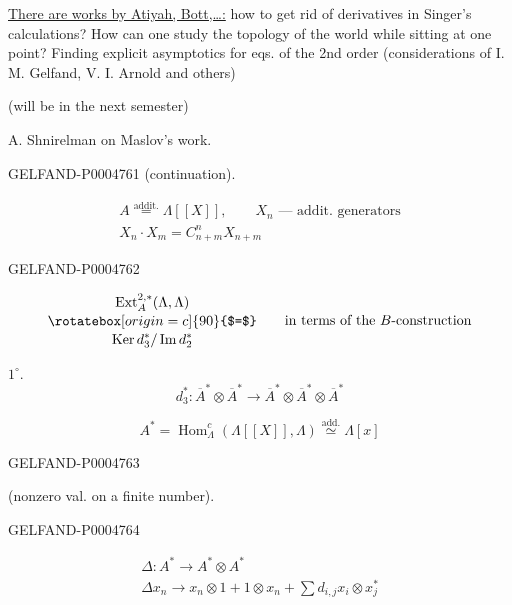 \uline{There are works by Atiyah, Bott,\ldots:} how to get rid of derivatives in Singer's calculations?
How can one study the topology of the world while sitting at one point? Finding explicit asymptotics for eqs. of the 2nd order (considerations of I. M. Gelfand, V. I. Arnold and others)

(will be in the next semester)

A. Shnirelman on Maslov's work.


\begin{GelfandAdjacentEvidence}{GELFAND-P000476}{1}
 (continuation).

\[
\begin{gathered}
A\overset{\text{addit.}}{=}\Lambda[[X]],\qquad
X_n\text{ — addit. generators}\\
X_n\cdot X_m=C_{n+m}^n X_{n+m}
\end{gathered}
\]
\end{GelfandAdjacentEvidence}
\begin{GelfandAdjacentEvidence}{GELFAND-P000476}{2}


\[
\begin{gathered}
\operatorname{Ext}_A^{2,*}(\Lambda,\Lambda)\\[-.4ex]
\rotatebox[origin=c]{90}{$=$}\\[-.4ex]
\operatorname{Ker}d_3^*/\operatorname{Im}d_2^*
\end{gathered}
\qquad\text{in terms of the }B\text{-construction}
\]

$1^\circ$.
\[
d_3^*\colon\overline A^*\otimes\overline A^*
\longrightarrow\overline A^*\otimes\overline A^*\otimes\overline A^*
\]

\[
A^*=\operatorname{Hom}_{\Lambda}^{c}(\Lambda[[X]],\Lambda)
\overset{\text{add.}}{\simeq}\Lambda[x]
\]
\end{GelfandAdjacentEvidence}
\begin{GelfandAdjacentEvidence}{GELFAND-P000476}{3}

 (nonzero val. on a finite number).
\end{GelfandAdjacentEvidence}
\begin{GelfandAdjacentEvidence}{GELFAND-P000476}{4}


\[
\begin{gathered}
\Delta\colon A^*\longrightarrow A^*\otimes A^*\\
\Delta x_n\longrightarrow x_n\otimes1+1\otimes x_n+\sum d_{i,j}x_i\otimes x_j^*
\end{gathered}
\]
\end{GelfandAdjacentEvidence}
